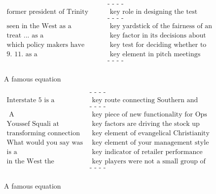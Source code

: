 \documentclass[a4paper,12pt,twoside,openright]{report}
\begin{document}
\begin{figure}[H]
\begin{align}
\text{                                                 } & \text{- - - -} \nonumber \\
\text{former president of Trinity College, who played a} & \text{ key role in designing the test} \nonumber \\
\text{                                                 } & \text{- - - -} \nonumber \\
\text{seen in the West as a} & \text{ key yardstick of the fairness of an election} \nonumber \\
\text{treat ... as a} & \text{ key factor in its decisions about regulatory issues} \nonumber \\
\text{which policy makers have called the} & \text{ key test for deciding whether to lower interest rates} \nonumber \\
\text{9. 11. as a} & \text{ key element in pitch meetings} \nonumber \\
\text{                                                 } & \text{- - - -} \nonumber \\
\end{align}
\caption{A famous equation}
\end{figure}



\begin{figure}[H]
\begin{align}
\text{                                                 } & \text{- - - -} \nonumber \\
\text{Interstate 5 is a} & \text{ key route connecting Southern and Northern California} \nonumber \\
\text{                                                 } & \text{- - - -} \nonumber \\
\text{ A} & \text{ key piece of new functionality for Ops Center } \nonumber \\
\text{Youssef Squali at Jefferies \& Co. says two} & \text{ key factors are driving the stock up} \nonumber \\
\text{transforming connection with believers is a} & \text{ key element of evangelical Christianity} \nonumber \\
\text{What would you say was the} & \text{ key element of your management style that allowed you to stabilize H.P.} \nonumber \\
\text{is a} & \text{ key indicator of retailer performance} \nonumber \\
\text{in the West the} & \text{ key players were not a small group of intellectuals reading Greek sources } \nonumber \\
\text{                                                 } & \text{- - - -} \nonumber \\
\end{align}
\caption{A famous equation}
\end{figure}
\end{document}
